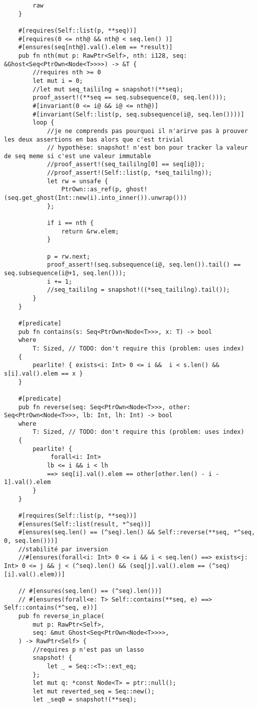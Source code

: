 \begin{verbatim}
        raw
    }

    #[requires(Self::list(p, **seq))]
    #[requires(0 <= nth@ && nth@ < seq.len() )]
    #[ensures(seq[nth@].val().elem == *result)]
    pub fn nth(mut p: RawPtr<Self>, nth: i128, seq: &Ghost<Seq<PtrOwn<Node<T>>>>) -> &T {
        //requires nth >= 0
        let mut i = 0;
        //let mut seq_taililng = snapshot!(**seq);
        proof_assert!(**seq == seq.subsequence(0, seq.len()));
        #[invariant(0 <= i@ && i@ <= nth@)]
        #[invariant(Self::list(p, seq.subsequence(i@, seq.len())))]
        loop {
            //je ne comprends pas pourquoi il n'arirve pas à prouver les deux assertions en bas alors que c'est trivial
            // hypothèse: snapshot! n'est bon pour tracker la valeur de seq meme si c'est une valeur immutable
            //proof_assert!(seq_taililng[0] == seq[i@]);
            //proof_assert!(Self::list(p, *seq_taililng));
            let rw = unsafe {
                PtrOwn::as_ref(p, ghost!(seq.get_ghost(Int::new(i).into_inner()).unwrap()))
            };

            if i == nth {
                return &rw.elem;
            }

            p = rw.next;
            proof_assert!(seq.subsequence(i@, seq.len()).tail() == seq.subsequence(i@+1, seq.len()));
            i += 1;
            //seq_taililng = snapshot!((*seq_taililng).tail());
        }
    }

    #[predicate]
    pub fn contains(s: Seq<PtrOwn<Node<T>>>, x: T) -> bool
    where
        T: Sized, // TODO: don't require this (problem: uses index)
    {
        pearlite! { exists<i: Int> 0 <= i &&  i < s.len() && s[i].val().elem == x }
    }

    #[predicate]
    pub fn reverse(seq: Seq<PtrOwn<Node<T>>>, other: Seq<PtrOwn<Node<T>>>, lb: Int, lh: Int) -> bool
    where
        T: Sized, // TODO: don't require this (problem: uses index)
    {
        pearlite! {
             forall<i: Int>
            lb <= i && i < lh
            ==> seq[i].val().elem == other[other.len() - i - 1].val().elem
        }
    }

    #[requires(Self::list(p, **seq))]
    #[ensures(Self::list(result, *^seq))]
    #[ensures(seq.len() == (^seq).len() && Self::reverse(**seq, *^seq, 0, seq.len()))]
    //stabilité par inversion
    //#[ensures(forall<i: Int> 0 <= i && i < seq.len() ==> exists<j: Int> 0 <= j && j < (^seq).len() && (seq[j].val().elem == (^seq)[i].val().elem))]

    // #[ensures(seq.len() == (^seq).len())]
    // #[ensures(forall<e: T> Self::contains(**seq, e) ==> Self::contains(*^seq, e))]
    pub fn reverse_in_place(
        mut p: RawPtr<Self>,
        seq: &mut Ghost<Seq<PtrOwn<Node<T>>>>,
    ) -> RawPtr<Self> {
        //requires p n'est pas un lasso
        snapshot! {
            let _ = Seq::<T>::ext_eq;
        };
        let mut q: *const Node<T> = ptr::null();
        let mut reverted_seq = Seq::new();
        let _seq0 = snapshot!(**seq);


\end{verbatim}
